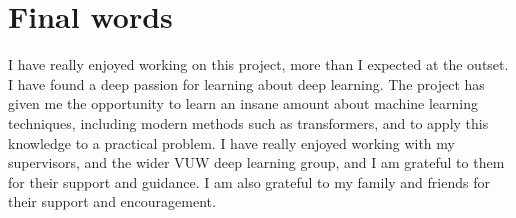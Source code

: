 \section{Final words}

I have really enjoyed working on this project, more than I expected at the outset. I have found a deep passion for learning about deep learning. The project has given me the opportunity to learn an insane amount about machine learning techniques, including modern methods such as transformers, and to apply this knowledge to a practical problem. I have really enjoyed working with my supervisors, and the wider VUW deep learning group, and I am grateful to them for their support and guidance. I am also grateful to my family and friends for their support and encouragement.
